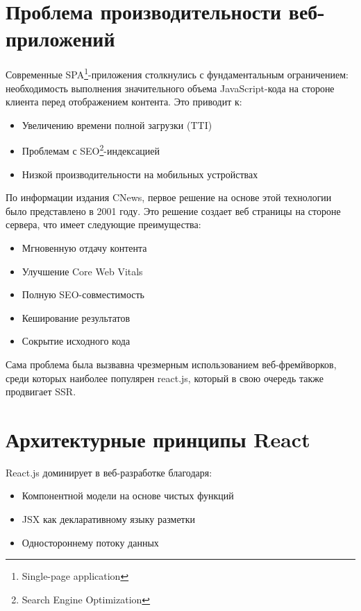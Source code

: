 \section{Проблема производительности веб-приложений}
Современные SPA\footnote{Single-page application}-приложения столкнулись с фундаментальным ограничением: необходимость выполнения значительного объема JavaScript-кода на стороне клиента перед отображением контента. %
Это приводит к:
\begin{itemize}
    \item Увеличению времени полной загрузки (TTI)
    \item Проблемам с SEO\footnote{Search Engine Optimization}-индексацией
    \item Низкой производительности на мобильных устройствах
\end{itemize}


По информации издания CNews, первое решение на основе этой технологии было представлено в 2001 году. %
Это решение создает веб страницы на стороне сервера, что имеет следующие преимущества:
\begin{itemize}
    \item Мгновенную отдачу контента
    \item Улучшение Core Web Vitals
    \item Полную SEO-совместимость
    \item Кеширование результатов
    \item Сокрытие исходного кода
\end{itemize}

Сама проблема была вызвавна чрезмерным использованием веб-фремйворков, среди которых наиболее популярен react.js, который в свою очередь также продвигает SSR.

\section{Архитектурные принципы React}
React.js доминирует в веб-разработке благодаря:
\begin{itemize}
    \item Компонентной модели на основе чистых функций
    \item JSX как декларативному языку разметки
    \item Одностороннему потоку данных
\end{itemize}

